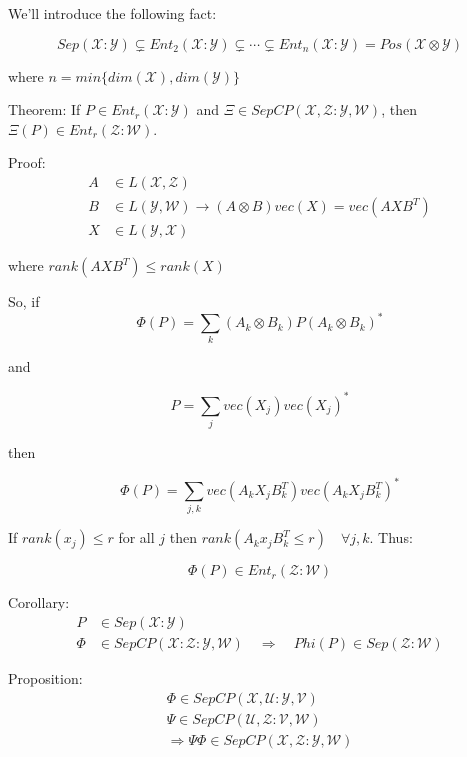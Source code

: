 \documentclass{article}
\begin{document}
We'll introduce the following fact:

\[ 
        Sep(\mathcal{X}:\mathcal{Y}) \subsetneq Ent_2(\mathcal{X}:\mathcal{Y})
        \subsetneq \cdots \subsetneq Ent_n (\mathcal{X}:\mathcal{Y}) = Pos
        \left( \mathcal{X} \otimes \mathcal{Y} \right)
\]

where $n = min\{dim(\mathcal{X}), dim \left( \mathcal{Y} \right) \}$

Theorem: If $P \in Ent_r \left( \mathcal{X}:\mathcal{Y} \right)$  and $\Xi \in
SepCP \left( \mathcal{X},\mathcal{Z}:\mathcal{Y},\mathcal{W} \right)$, then
$\Xi(P) \in Ent_r \left( \mathcal{Z}:\mathcal{W} \right)$.

Proof:
\begin{align*}
    A &\in L(\mathcal{X},\mathcal{Z}) \\
    B &\in L \left( \mathcal{Y},\mathcal{W} \right) \rightarrow \left( A \otimes
B\right)vec(X) = vec(AXB^T) \\
X &\in L(\mathcal{Y},\mathcal{X})
\end{align*}

where $rank(AXB^T) \le rank(X)$

So, if 
\[ 
        \Phi(P) = \sum_k \left( A_k \otimes B_k \right) P \left( A_k \otimes B_k
        \right)^*
\]

and 

\[ 
        P = \sum_j vec(X_j) vec \left( X_j \right)^* 
\]

then

\[ 
        \Phi(P) = \sum_{j,k} vec(A_k X_j B_k^T) vec \left( A_k X_j B_k^T
        \right)^*
\]

If $rank(x_j) \le r$ for all $j$ then $rank \left( A_k x_j B_k^T \le r \right)
\quad \forall j,k$. Thus:

\[ 
        \Phi(P) \in Ent_r \left( \mathcal{Z}:\mathcal{W} \right) 
\]

Corollary:
\begin{align*}
    P &\in Sep(\mathcal{X}:\mathcal{Y}) \\
    \Phi &\in SepCP \left( \mathcal{X}:\mathcal{Z}:\mathcal{Y},\mathcal{W} \right)
\quad \Rightarrow \quad Phi(P) \in Sep(\mathcal{Z}:\mathcal{W})
\end{align*}

Proposition:
\begin{align*}
    \Phi \in SepCP \left( \mathcal{X}, \mathcal{U}:\mathcal{Y},\mathcal{V}
    \right) \\
    \Psi \in SepCP \left( \mathcal{U},\mathcal{Z}:\mathcal{V},\mathcal{W}
    \right) \\
    \Rightarrow \Psi\Phi \in
    SepCP(\mathcal{X},\mathcal{Z}:\mathcal{Y},\mathcal{W})
\end{align*}
\end{document}
